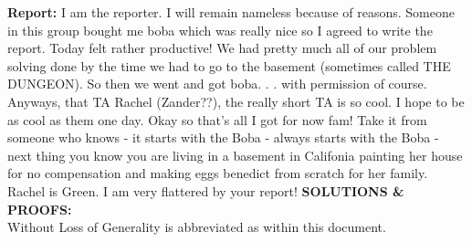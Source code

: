 \textbf{Report:} I am the reporter. I will remain nameless because of reasons. Someone in this group bought me boba which was really nice so I agreed to write the report. Today felt rather productive! We had pretty much all of our problem solving done by the time we had to go to the basement (sometimes called THE DUNGEON). So then we went and got boba. . . with permission of course. Anyways, that TA Rachel (Zander??), the really short TA is so cool. I hope to be as cool as them one day. Okay so that's all I got for now fam! 
\color{amethyst}Take it from someone who knows - it starts with the Boba - always starts with the Boba - next thing you know you are living in a basement in Califonia painting her house for no compensation and making eggs benedict from scratch for her family. \color{black}
\divider
\color{teal} Rachel is Green. I am very flattered by your report! \color{black}
\newline
\textbf{SOLUTIONS \& PROOFS:}\\
Without Loss of Generality is abbreviated as \WLoG{} within this document.

